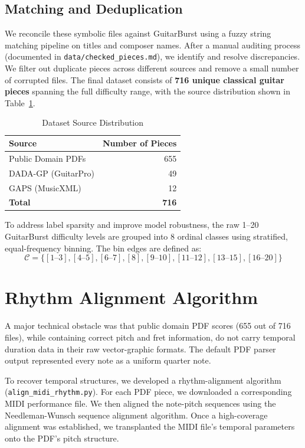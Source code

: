 \subsection{Matching and Deduplication}
We reconcile these symbolic files against GuitarBurst using a fuzzy string matching pipeline on titles and composer names. After a manual auditing process (documented in \texttt{data/checked\_pieces.md}), we identify and resolve discrepancies. We filter out duplicate pieces across different sources and remove a small number of corrupted files. The final dataset consists of \textbf{716 unique classical guitar pieces} spanning the full difficulty range, with the source distribution shown in Table~\ref{tab:dataset_sources}.

\begin{table}[h]
\centering
\caption{Dataset Source Distribution}
\label{tab:dataset_sources}
\begin{tabular}{lr}
\toprule
\textbf{Source} & \textbf{Number of Pieces} \\
\midrule
Public Domain PDFs & 655 \\
DADA-GP (GuitarPro) & 49 \\
GAPS (MusicXML) & 12 \\
\midrule
\textbf{Total} & \textbf{716} \\
\bottomrule
\end{tabular}
\end{table}

To address label sparsity and improve model robustness, the raw 1–20 GuitarBurst difficulty levels are grouped into 8 ordinal classes using stratified, equal-frequency binning. The bin edges are defined as:
\begin{equation*}
    \mathcal{C} = \{ [1\text{--}3], [4\text{--}5], [6\text{--}7], [8], [9\text{--}10], [11\text{--}12], [13\text{--}15], [16\text{--}20] \}
\end{equation*}

\section{Rhythm Alignment Algorithm}
A major technical obstacle was that public domain PDF scores (655 out of 716 files), while containing correct pitch and fret information, do not carry temporal duration data in their raw vector-graphic formats. The default PDF parser output represented every note as a uniform quarter note.

To recover temporal structures, we developed a rhythm-alignment algorithm (\texttt{align\_midi\_rhythm.py}). For each PDF piece, we downloaded a corresponding MIDI performance file. We then aligned the note-pitch sequences using the Needleman-Wunsch sequence alignment algorithm. Once a high-coverage alignment was established, we transplanted the MIDI file's temporal parameters onto the PDF's pitch structure.

